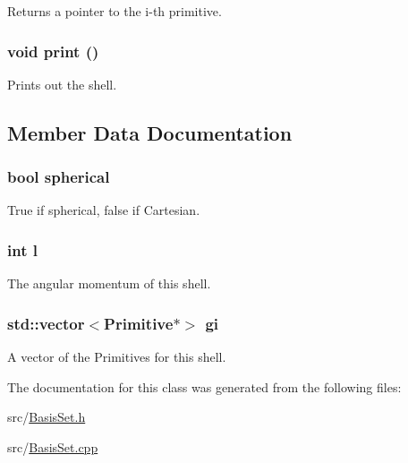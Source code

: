 Returns a pointer to the i-\/th primitive. \hypertarget{classJKBuilder_1_1Shell_a388f572c62279f839ee138a9afbdeeb5}{
\subsubsection[{print}]{\setlength{\rightskip}{0pt plus 5cm}void print ()}}
\label{classJKBuilder_1_1Shell_a388f572c62279f839ee138a9afbdeeb5}


Prints out the shell. 

\subsection{Member Data Documentation}
\hypertarget{classJKBuilder_1_1Shell_a8a5f217a40aac0ce092effdd9b6db9f6}{
\subsubsection[{spherical}]{\setlength{\rightskip}{0pt plus 5cm}bool {\bf spherical}}}
\label{classJKBuilder_1_1Shell_a8a5f217a40aac0ce092effdd9b6db9f6}


True if spherical, false if Cartesian. \hypertarget{classJKBuilder_1_1Shell_a89606eca6b563ec68d2da2e84657736f}{
\subsubsection[{l}]{\setlength{\rightskip}{0pt plus 5cm}int {\bf l}}}
\label{classJKBuilder_1_1Shell_a89606eca6b563ec68d2da2e84657736f}


The angular momentum of this shell. \hypertarget{classJKBuilder_1_1Shell_afd0049f3a997082e636f4dae72879da2}{
\subsubsection[{gi}]{\setlength{\rightskip}{0pt plus 5cm}std::vector$<${\bf Primitive}$\ast$$>$ {\bf gi}}}
\label{classJKBuilder_1_1Shell_afd0049f3a997082e636f4dae72879da2}


A vector of the Primitives for this shell. 

The documentation for this class was generated from the following files:\begin{DoxyCompactItemize}
\item 
src/\hyperlink{BasisSet_8h}{BasisSet.h}\item 
src/\hyperlink{BasisSet_8cpp}{BasisSet.cpp}\end{DoxyCompactItemize}
